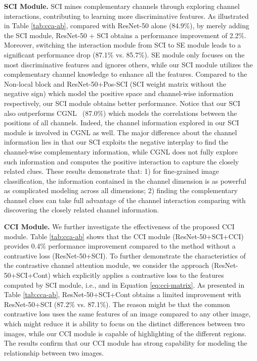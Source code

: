 \documentclass[letterpaper]{article} \usepackage{aaai20}  \usepackage{times}  \usepackage{helvet} \usepackage{courier}  \usepackage[hyphens]{url}  \usepackage{graphicx} \urlstyle{rm} \def\UrlFont{\rm}  \usepackage{graphicx}  \frenchspacing  \setlength{\pdfpagewidth}{8.5in}  \setlength{\pdfpageheight}{11in}  \usepackage{amsmath,amssymb}
\begin{document}
\textbf{SCI Module.}
SCI mines complementary channels through exploring channel interactions, contributing to learning more discriminative features.
As illustrated in Table \ref{tab:cca-ab}, compared with ResNet-50 alone (84.9\%), by merely adding the SCI module, ResNet-50 + SCI obtains a performance improvement of 2.2\%. Moreover, switching the interaction module from SCI to SE module leads to a significant performance drop (87.1\% vs. 85.7\%).
SE module only focuses on the most discriminative features and ignores others, while our SCI module utilizes the complementary channel knowledge to enhance all the features.
Compared to the Non-local block and ResNet-50+Pos-SCI (SCI weight matrix  without the negative sign) which model the positive space and channel-wise information respectively, our SCI module obtains better performance.
 Notice that our SCI also outperforms
CGNL~\cite{yue2018compact} (87.0\%) which models the correlations between the positions of all channels.
Indeed, the channel information explored in our SCI module is involved in CGNL as well.
The major difference about the channel information lies in that our SCI exploits the negative interplay to find the channel-wise complementary  information, while CGNL does not fully explore such information and computes the positive interaction to capture the closely related clues.
These results demonstrate that: 1) for fine-grained image classification, the information contained in the channel dimension is as powerful as complicated modeling across all dimensions; 2) finding the complementary channel clues can take full advantage of the channel interaction comparing with discovering the closely related channel information.

\textbf{CCI Module.} We further investigate the effectiveness of the proposed CCI module.
Table \ref{tab:cca-ab} shows that the CCI module (ResNet-50+SCI+CCI) provides 0.4\% performance improvement compared to the method without a contrastive loss (ResNet-50+SCI).
To further demonstrate the characteristics of the contrastive channel attention module, we consider the approach (ResNet-50+SCI+Cont) which explicitly applies a contrastive loss to the features computed by SCI module, i.e.,  and  in Equation \ref{eq:cci-matrix}.
As presented in Table \ref{tab:cca-ab}, ResNet-50+SCI+Cont obtains a limited improvement with ResNet-50+SCI (87.2\% vs. 87.1\%).
The reason might be that the common contrastive loss uses the same features of an image compared to any other image, which might reduce it is ability to focus on the distinct differences between two images, while our CCI module is capable of highlighting of the different regions.
The results confirm that our CCI module has strong capability for modeling the relationship between two images.
\end{document}
